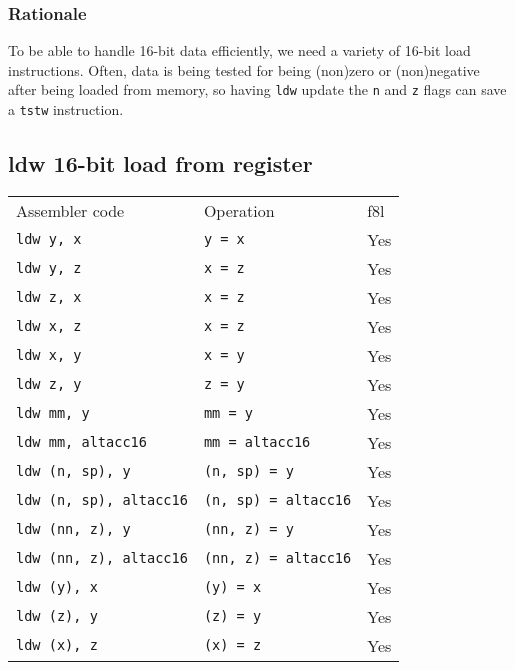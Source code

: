 \documentclass{book}
\begin{document}
\subsubsection*{Rationale}

To be able to handle 16-bit data efficiently, we need a variety of 16-bit load instructions. Often, data is being tested for being (non)zero or (non)negative after being loaded from memory, so having \texttt{ldw} update the \texttt{n} and \texttt{z} flags can save a \texttt{tstw} instruction.


\subsection{ldw 16-bit load from register}

\begin{tabular}{l l l}
Assembler code                   & Operation                   & f8l \\
\texttt{ldw y, x}                & \texttt{y = x}              & Yes \\
\texttt{ldw y, z}                & \texttt{x = z}              & Yes \\
\texttt{ldw z, x}                & \texttt{x = z}              & Yes \\
\texttt{ldw x, z}                & \texttt{x = z}              & Yes \\
\texttt{ldw x, y}                & \texttt{x = y}              & Yes \\
\texttt{ldw z, y}                & \texttt{z = y}              & Yes \\
\texttt{ldw mm, y}               & \texttt{mm = y}             & Yes \\
\texttt{ldw mm, altacc16}        & \texttt{mm = altacc16}      & Yes \\
\texttt{ldw (n, sp), y}          & \texttt{(n, sp) = y}        & Yes \\
\texttt{ldw (n, sp), altacc16}   & \texttt{(n, sp) = altacc16} & Yes \\
\texttt{ldw (nn, z), y}          & \texttt{(nn, z) = y}        & Yes \\
\texttt{ldw (nn, z), altacc16}   & \texttt{(nn, z) = altacc16} & Yes \\
\texttt{ldw (y), x}              & \texttt{(y) = x}            & Yes \\
\texttt{ldw (z), y}              & \texttt{(z) = y}            & Yes \\
\texttt{ldw (x), z}              & \texttt{(x) = z}            & Yes \\

\end{tabular}
\end{document}
